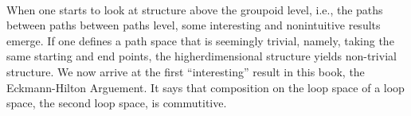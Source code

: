 \begin{code}
%
\>[6]\AgdaSpace{}%
\AgdaSymbol{:}\AgdaSpace{}%
\AgdaSymbol{(}\AgdaSpace{}%
\AgdaSymbol{:}\AgdaSpace{}%
\AgdaSymbol{)}\AgdaSpace{}%
\AgdaSpace{}%
\AgdaSpace{}%
\AgdaSpace{}%
\AgdaSpace{}%
\<%
\\
%
\>[6]\AgdaSpace{}%
\AgdaSpace{}%
\AgdaSymbol{=}\AgdaSpace{}%
\<%
\\
%
\>[6]\AgdaSpace{}%
\AgdaSymbol{:}\AgdaSpace{}%
\AgdaSymbol{(}\AgdaSpace{}%
\AgdaSymbol{:}\AgdaSpace{}%
\AgdaSymbol{)}\AgdaSpace{}%
\AgdaSpace{}%
\AgdaSpace{}%
\AgdaSpace{}%
\AgdaSpace{}%
\<%
\\
%
\>[6]\AgdaSpace{}%
\AgdaSpace{}%
\AgdaSpace{}%
\AgdaSpace{}%
\AgdaSymbol{=}\AgdaSpace{}%
\AgdaSpace{}%
\AgdaSpace{}%
\AgdaSpace{}%
\AgdaSpace{}%
\AgdaSpace{}%
\<%
\\
%
\>[6]\AgdaSpace{}%
\AgdaSymbol{:}\AgdaSpace{}%
\AgdaSymbol{(}\AgdaSpace{}%
\AgdaSymbol{:}\AgdaSpace{}%
\AgdaSymbol{)}\AgdaSpace{}%
\AgdaSpace{}%
\AgdaSpace{}%
\AgdaSpace{}%
\AgdaSpace{}%
\<%
\\
%
\>[6]\AgdaSpace{}%
\AgdaSpace{}%
\AgdaSpace{}%
\AgdaSpace{}%
\AgdaSpace{}%
\AgdaSpace{}%
\AgdaSymbol{=}\AgdaSpace{}%
\AgdaSpace{}%
\AgdaSpace{}%
\AgdaSpace{}%
\AgdaSpace{}%
\AgdaSpace{}%
\AgdaSpace{}%
\AgdaSpace{}%
\<%
\\
\>[0]\<%
\end{code}

When one starts to look at structure above the groupoid level, i.e., the paths between paths between paths level, some interesting and nonintuitive results emerge. If one defines a path space that is seemingly trivial, namely, taking the same starting and end points, the higherdimensional structure yields non-trivial structure. 
We now arrive at the first ``interesting'' result in this book, the Eckmann-Hilton Arguement. It says that composition on the loop space of a loop space, the second loop space, is commutitive.



